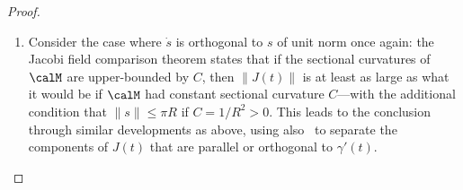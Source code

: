 \begin{proof}
\begin{enumerate}
		\item \citep[Thm.~11.9(a)]{lee2018riemannian} Consider the case where $\dot s$ is orthogonal to $s$ of unit norm once again: the Jacobi field comparison theorem states that if the sectional curvatures of $\calM$ are upper-bounded by $C$, then $\|J(t)\|$ is at least as large as what it would be if $\calM$ had constant sectional curvature $C$---with the additional condition that $\|s\| \leq \pi R$ if $C = 1/R^2 > 0$. This leads to the conclusion through similar developments as above, using also~\citep[Prop.~10.7]{lee2018riemannian} to separate the components of $J(t)$ that are parallel or orthogonal to $\gamma'(t)$.
		\qedhere
	\end{enumerate}

%
%	
%

\end{proof}
